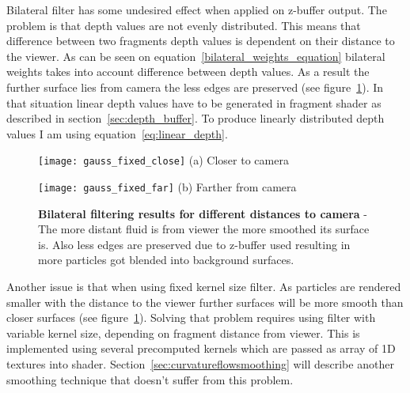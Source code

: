 Bilateral filter has some undesired effect when applied on z-buffer output. The problem is that depth values are not evenly distributed. This means that difference between two fragments depth values is dependent on their distance to the viewer. As can be seen on equation~\ref{bilateral_weights_equation} bilateral weights takes into account difference between depth values. As a result the further surface lies from camera the less edges are preserved (see figure~\ref{edge_preservation}). In that situation linear depth values have to be generated in fragment shader as described in section~\ref{sec:depth_buffer}. To produce linearly distributed depth values I am using equation~\ref{eq:linear_depth}.
\begin{figure}[ht]
\begin{minipage}[t]{0.5\linewidth}
\centering
\texttt{[image: gauss\_fixed\_close]}
(a) Closer to camera
\end{minipage}
\hspace{0.2cm}
\begin{minipage}[t]{0.5\linewidth}
\centering
\texttt{[image: gauss\_fixed\_far]}
(b) Farther from camera
\end{minipage}
\caption{\textbf{Bilateral filtering results for different distances to camera} - The more distant fluid is from viewer the more smoothed its surface is. Also less edges are preserved due to z-buffer used resulting in more particles got blended into background surfaces. }
\label{edge_preservation}
\end{figure}

Another issue is that when using fixed kernel size filter. As particles are rendered smaller with the distance to the viewer further surfaces will be more smooth than closer surfaces (see figure~\ref{edge_preservation}). Solving that problem requires using filter with variable kernel size, depending on fragment distance from viewer. This is implemented using several precomputed kernels which are passed as array of 1D textures into shader. Section~\ref{sec:curvatureflowsmoothing} will describe another smoothing technique that doesn't suffer from this problem. 

